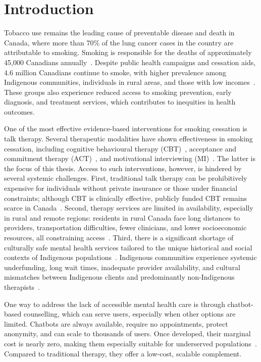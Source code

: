 \chapter{Introduction}

Tobacco use remains the leading cause of preventable disease and death in Canada, where more than 70\% of the lung cancer cases in the country are attributable to smoking. Smoking is responsible for the deaths of approximately 45,000 Canadians annually~\cite{poirier2019estimates}. Despite public health campaigns and cessation aids, 4.6 million Canadians continue to smoke, with higher prevalence among Indigenous communities, individuals in rural areas, and those with low incomes~\cite{cpac2020lung}. These groups also experience reduced access to smoking prevention, early diagnosis, and treatment services, which contributes to inequities in health outcomes.

One of the most effective evidence-based interventions for smoking cessation is talk therapy. Several therapeutic modalities have shown effectiveness in smoking cessation, including cognitive behavioural therapy (CBT)~\cite{beck2011cognitive}, acceptance and commitment therapy (ACT)~\cite{hayes1999acceptance}, and motivational interviewing (MI)~\cite{MillerRollnick2023}. The latter is the focus of this thesis. Access to such interventions, however, is hindered by several systemic challenges. First, traditional talk therapy can be prohibitively expensive for individuals without private insurance or those under financial constraints; although CBT is clinically effective, publicly funded CBT remains scarce in Canada~\cite{doi:10.1177/0253717620957496,doi:10.1177/0706743716642416}. Second, therapy services are limited in availability, especially in rural and remote regions: residents in rural Canada face long distances to providers, transportation difficulties, fewer clinicians, and lower socioeconomic resources, all constraining access~\cite{burns2007rural,james2021improving}. Third, there is a significant shortage of culturally safe mental health services tailored to the unique historical and social contexts of Indigenous populations~\cite{josewski2023improving,hartwasekeesikaw2009cultural}. Indigenous communities experience systemic underfunding, long wait times, inadequate provider availability, and cultural mismatches between Indigenous clients and predominantly non-Indigenous therapists~\cite{turner2018poverty}.


One way to address the lack of accessible mental health care is through chatbot-based counselling, which can serve users, especially when other options are limited. Chatbots are always available, require no appointments, protect anonymity, and can scale to thousands of users. Once developed, their marginal cost is nearly zero, making them especially suitable for underserved populations~\cite{torous2017digital,miner2016smartphone}. Compared to traditional therapy, they offer a low-cost, scalable complement.



